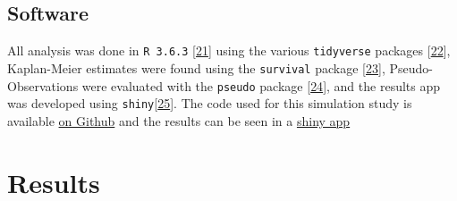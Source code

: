 \documentclass[
]{article}
\begin{document}
\hypertarget{software}{%
\subsection{Software}\label{software}}

All analysis was done in \texttt{R\ 3.6.3} {[}\protect\hyperlink{ref-r_core_team_r_nodate}{21}{]} using the various \texttt{tidyverse} packages {[}\protect\hyperlink{ref-wickham_tidy_2017}{22}{]}, Kaplan-Meier estimates were found using the \texttt{survival} package {[}\protect\hyperlink{ref-therneau_package_2020}{23}{]}, Pseudo-Observations were evaluated with the \texttt{pseudo} package {[}\protect\hyperlink{ref-perme_pseudo_2017}{24}{]}, and the results app was developed using \texttt{shiny}{[}\protect\hyperlink{ref-chang_shiny_2020}{25}{]}. The code used for this simulation study is available \href{https://github.com/MyKo101/IPCW-Logistic}{on Github} and the results can be seen in a \href{https://michael-barrowman.shinyapps.io/IPCW_Calibrations/?_ga=2.129261196.1072091615.1588464259-38998367.1584541320}{shiny app}

\hypertarget{results-1}{%
\section{Results}\label{results-1}}
\end{document}

